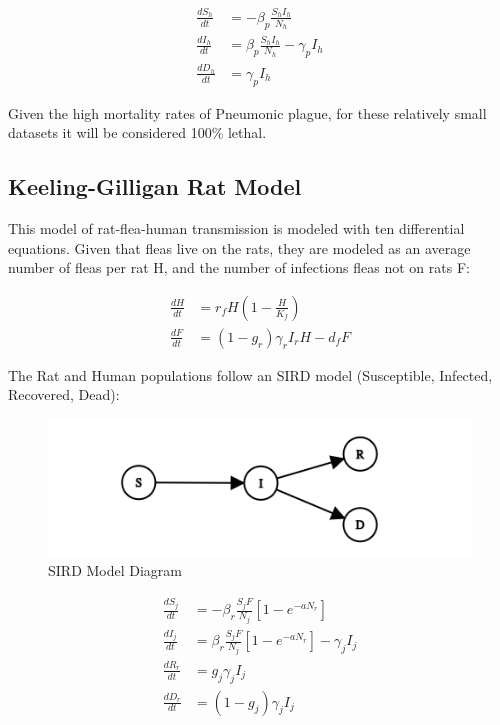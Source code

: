 \documentclass [letterpaper, 12pt] {article}
\begin{document}
\begin{align}
	\frac{dS_h}{dt} & = - \beta_p \frac{S_h I_h}{N_h}              \\
	\frac{dI_h}{dt} & = \beta_p \frac{S_h I_h}{N_h} - \gamma_p I_h \\
	\frac{dD_h}{dt} & = \gamma_p I_h
\end{align}

Given the high mortality rates of Pneumonic plague, for these relatively small datasets it will be considered 100\% lethal.

\newpage
\subsection {Keeling-Gilligan Rat Model}
This model of rat-flea-human transmission is modeled with ten differential equations. Given that fleas live on the rats, they are modeled as an average number of fleas per rat H, and the number of infections fleas not on rats F:

\begin{align}
	\frac{dH}{dt} & = r_f H \left( 1 - \frac{H}{K_f} \right) \\
	\frac{dF}{dt} & = (1 - g_r) \gamma_r I_r H - d_f F
\end{align}

The Rat and Human populations follow an SIRD model (Susceptible, Infected, Recovered, Dead):

\begin{figure}[H]
	\centering
	\includegraphics[width=0.65\linewidth]{sird-graph.png}
	\caption{SIRD Model Diagram}
\end{figure}

\begin{align}
	\frac{dS_j}{dt} & = - \beta_r \frac{S_j F}{N_j} \left[ 1 - e^{-aN_r} \right]              \\
	\frac{dI_j}{dt} & = \beta_r \frac{S_j F}{N_j} \left[ 1 - e^{-aN_r} \right] - \gamma_j I_j \\
	\frac{dR_r}{dt} & = g_j \gamma_j I_j                                                      \\
	\frac{dD_r}{dt} & = (1 - g_j) \gamma_j I_j
\end{align}
\end{document}
